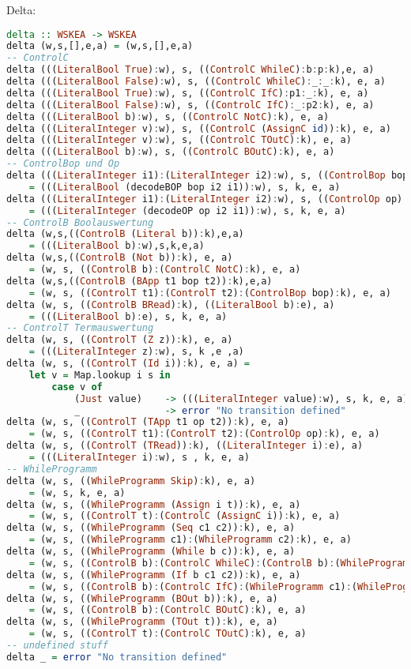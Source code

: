\documentclass[11pt,a4paper,ngerman]{article}
\begin{document}
Delta:
\begin{lstlisting}[language=haskell]
delta :: WSKEA -> WSKEA
delta (w,s,[],e,a) = (w,s,[],e,a)
-- ControlC
delta (((LiteralBool True):w), s, ((ControlC WhileC):b:p:k),e, a) 		= (w, s, (p:b:(ControlC WhileC):b:p:k), e, a)
delta (((LiteralBool False):w), s, ((ControlC WhileC):_:_:k), e, a)		= (w, s, k, e, a)
delta (((LiteralBool True):w), s, ((ControlC IfC):p1:_:k), e, a)		= (w, s, (p1:k), e, a)
delta (((LiteralBool False):w), s, ((ControlC IfC):_:p2:k), e, a)		= (w, s, (p2:k), e ,a)
delta (((LiteralBool b):w), s, ((ControlC NotC):k), e, a)				= (((LiteralBool (not b)):w), s, k, e, a)
delta (((LiteralInteger v):w), s, ((ControlC (AssignC id)):k), e, a)	= (w, Map.insert id v s, k, e, a)
delta (((LiteralInteger v):w), s, ((ControlC TOutC):k), e, a)			= (w, s, k, e, ((LiteralInteger v):a))
delta (((LiteralBool b):w), s, ((ControlC BOutC):k), e, a)				= (w, s, k, e, ((LiteralBool b):a))
-- ControlBop und Op
delta (((LiteralInteger i1):(LiteralInteger i2):w), s, ((ControlBop bop):k), e, a)
	= (((LiteralBool (decodeBOP bop i2 i1)):w), s, k, e, a)
delta (((LiteralInteger i1):(LiteralInteger i2):w), s, ((ControlOp op):k), e, a)
	= (((LiteralInteger (decodeOP op i2 i1)):w), s, k, e, a)
-- ControlB Boolauswertung
delta (w,s,((ControlB (Literal b)):k),e,a)
	= (((LiteralBool b):w),s,k,e,a)
delta (w,s,((ControlB (Not b)):k), e, a)
	= (w, s, ((ControlB b):(ControlC NotC):k), e, a)
delta (w,s,((ControlB (BApp t1 bop t2)):k),e,a)
	= (w, s, ((ControlT t1):(ControlT t2):(ControlBop bop):k), e, a)
delta (w, s, ((ControlB BRead):k), ((LiteralBool b):e), a)
	= (((LiteralBool b):e), s, k, e, a)
-- ControlT Termauswertung
delta (w, s, ((ControlT (Z z)):k), e, a)
	= (((LiteralInteger z):w), s, k ,e ,a)
delta (w, s, ((ControlT (Id i)):k), e, a) =
	let v = Map.lookup i s in
		case v of
			(Just value)	-> (((LiteralInteger value):w), s, k, e, a)
			_				-> error "No transition defined"
delta (w, s, ((ControlT (TApp t1 op t2)):k), e, a)
	= (w, s, ((ControlT t1):(ControlT t2):(ControlOp op):k), e, a)
delta (w, s, ((ControlT (TRead)):k), ((LiteralInteger i):e), a)
	= (((LiteralInteger i):w), s , k, e, a)
-- WhileProgramm
delta (w, s, ((WhileProgramm Skip):k), e, a)
	= (w, s, k, e, a)
delta (w, s, ((WhileProgramm (Assign i t)):k), e, a)
	= (w, s, ((ControlT t):(ControlC (AssignC i)):k), e, a)
delta (w, s, ((WhileProgramm (Seq c1 c2)):k), e, a)
	= (w, s, ((WhileProgramm c1):(WhileProgramm c2):k), e, a)
delta (w, s, ((WhileProgramm (While b c)):k), e, a)
	= (w, s, ((ControlB b):(ControlC WhileC):(ControlB b):(WhileProgramm c):k), e, a)
delta (w, s, ((WhileProgramm (If b c1 c2)):k), e, a)
	= (w, s, ((ControlB b):(ControlC IfC):(WhileProgramm c1):(WhileProgramm c2):k), e, a)
delta (w, s, ((WhileProgramm (BOut b)):k), e, a)
	= (w, s, ((ControlB b):(ControlC BOutC):k), e, a)
delta (w, s, ((WhileProgramm (TOut t)):k), e, a)
	= (w, s, ((ControlT t):(ControlC TOutC):k), e, a)
-- undefined stuff
delta _ = error "No transition defined"

\end{lstlisting}

\label{LastPage}
\end{document}
